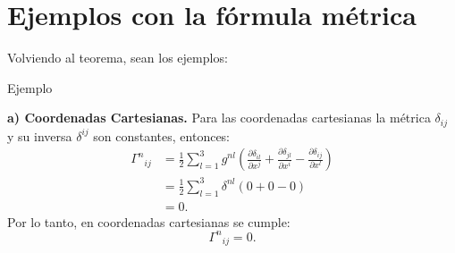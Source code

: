 \documentclass[../apunte_mecanica_clasica.tex]{subfiles}%
\begin{document}
\section{Ejemplos con la fórmula métrica}

Volviendo al teorema, sean los ejemplos:

\begin{apuntebloque}{Ejemplo}

\textbf{a) Coordenadas Cartesianas.}  
Para las coordenadas cartesianas la métrica $\delta_{ij}$ y su inversa 
$\delta^{ij}$ son constantes, entonces:
\begin{align*}
    \Gamma^n{}_{ij} &= \tfrac{1}{2} \sum_{l=1}^3 g^{nl} 
    \left( \frac{\partial \delta_{il}}{\partial x^j}
         + \frac{\partial \delta_{jl}}{\partial x^i}
         - \frac{\partial \delta_{ij}}{\partial x^l} \right) \\[6pt]
    &= \tfrac{1}{2} \sum_{l=1}^3 \delta^{nl} (0+0-0)\\
    &= 0.
\end{align*}
Por lo tanto, en coordenadas cartesianas se cumple:
\begin{equation*}
    \Gamma^n{}_{ij} = 0.
\end{equation*}

\end{apuntebloque}
\end{document}
